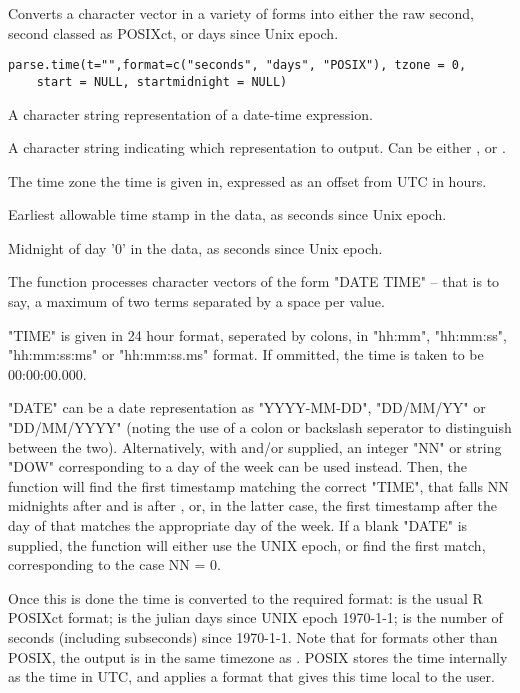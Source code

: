 \documentclass[a4paper]{book}
\begin{document}
%
\begin{Description}\relax
Converts a character vector in a variety of forms into either the raw second, second classed as POSIXct, or days since Unix epoch.
\end{Description}
%
\begin{Usage}
\begin{verbatim}
parse.time(t="",format=c("seconds", "days", "POSIX"), tzone = 0, 
	start = NULL, startmidnight = NULL)
\end{verbatim}
\end{Usage}
%
\begin{Arguments}
\begin{ldescription}
\item[\code{t}] A character string representation of a date-time expression.
\item[\code{format}] A character string indicating which representation to output.  Can be either ,  or .
\item[\code{tzone}] The time zone the time is given in, expressed as an offset from UTC in hours.
\item[\code{start}] Earliest allowable time stamp in the data, as seconds since Unix epoch.
\item[\code{startmidnight}] Midnight of day '0' in the data, as seconds since Unix epoch.
\end{ldescription}
\end{Arguments}
%
\begin{Details}\relax
The function processes character vectors of the form "DATE TIME" -- that is to say, a maximum of two terms separated by a space per value. 

"TIME" is given in 24 hour format, seperated by colons, in "hh:mm", "hh:mm:ss", "hh:mm:ss:ms" or "hh:mm:ss.ms" format. If ommitted, the time is taken to be 00:00:00.000.

"DATE" can be a date representation as "YYYY-MM-DD", "DD/MM/YY" or "DD/MM/YYYY" (noting the use of a colon or backslash seperator to distinguish between the two). Alternatively, with  and/or  supplied, an integer "NN" or string "DOW" corresponding to a day of the week can be used instead. Then, the function will find the first timestamp matching the correct "TIME", that falls NN midnights after  and is after , or, in the latter case, the first timestamp after the day of  that matches the appropriate day of the week. If a blank "DATE" is supplied, the function will either use the UNIX epoch, or find the first match, corresponding to the case NN = 0.

Once this is done the time is converted to the required format:  is the usual R POSIXct format;  is the julian days since UNIX epoch 1970-1-1;  is the number of seconds (including subseconds) since 1970-1-1. Note that for formats other than POSIX, the output is in the same timezone as . POSIX stores the time internally as the time in UTC, and applies a format that gives this time local to the user.
\end{Details}
\end{document}
